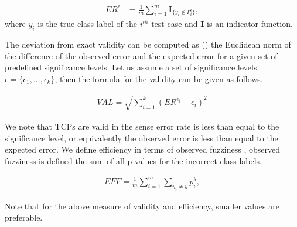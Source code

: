 \documentclass[main]{subfiles}
\begin{document}
\begin{definition}
\begin{align} \label{eq:errorRate}
		ER^{\epsilon} &= \frac{ 1}{m} \sum\limits_{i=1}^{m} \textbf{I}_{ \{y_i \not\in \Gamma_i^{\epsilon} \} },		
\end{align}	
where $y_i$ is the true class label of the $i^{th}$ test case and $\textbf{I}$ is an indicator function. 	
\end{definition}
 
The deviation from exact validity can be computed as (\cite{carlsson2017comparing}) the Euclidean norm of the difference of the observed error and the expected error for a given set of predefined significance levels. Let us assume a set of significance levels $\epsilon = \{ \epsilon_1, ..., \epsilon_k \}$, then the formula for the validity can be given as follows.

\begin{definition}[Validity]
\begin{align} \label{eq:validity}
		VAL = \sqrt{ \sum\limits_{i=1}^{k} (ER^{\epsilon_i} -\epsilon_i)^2 }
\end{align}	 
\end{definition}
We note that TCPs are valid in the sense error rate is less than equal to the significance level, or equivalently the observed error is less than equal to the expected error.
We define efficiency in terms of observed fuzziness \cite{vovk2016criteria}, observed fuzziness is defined the sum of all p-values for the incorrect class labels. %
\begin{definition}[Efficiency]
\begin{align} \label{eq:efficiency}
	EFF =\frac{ 1}{m} \sum\limits_{i=1}^{m} \sum\limits_{y_i \neq y }  p_i^y,		
\end{align}
\end{definition}
Note that for the above measure of validity and efficiency, smaller
values are preferable.
\end{document}
